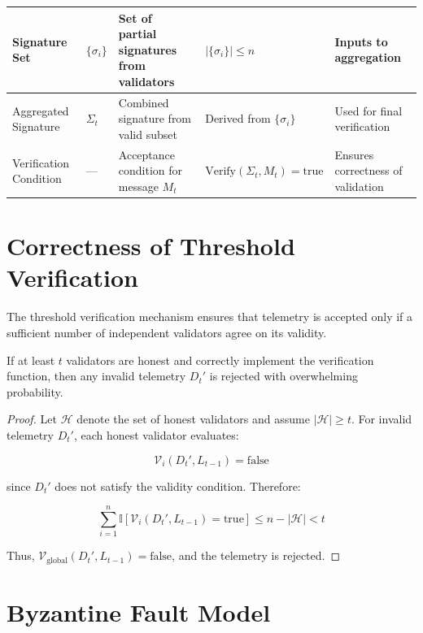 \begin{table}[htbp]
\begin{tabularx}{\textwidth}{|p{2.5cm}|p{2cm}|X|X|X|}
\hline

Signature Set & $\{\sigma_i\}$ & Set of partial signatures from validators & $|\{\sigma_i\}| \leq n$ & Inputs to aggregation \\

\hline

Aggregated Signature & $\Sigma_t$ & Combined signature from valid subset & Derived from $\{\sigma_i\}$ & Used for final verification \\

\hline

Verification Condition & --- & Acceptance condition for message $M_t$ & $\text{Verify}(\Sigma_t, M_t) = \text{true}$ & Ensures correctness of validation \\

\hline

\end{tabularx}
\end{table}

\section{Correctness of Threshold Verification}

The threshold verification mechanism ensures that telemetry is accepted only if a sufficient number of independent validators agree on its validity.

\begin{theorem}
If at least $t$ validators are honest and correctly implement the verification function, then any invalid telemetry $D_t'$ is rejected with overwhelming probability.
\end{theorem}

\begin{proof}
Let $\mathcal{H}$ denote the set of honest validators and assume $|\mathcal{H}| \geq t$. For invalid telemetry $D_t'$, each honest validator evaluates:

\[
\mathcal{V}_i(D_t', L_{t-1}) = \text{false}
\]

since $D_t'$ does not satisfy the validity condition. Therefore:

\[
\sum_{i=1}^{n} \mathbb{I}[\mathcal{V}_i(D_t', L_{t-1}) = \text{true}] \leq n - |\mathcal{H}| < t
\]

Thus, $\mathcal{V}_{\text{global}}(D_t', L_{t-1}) = \text{false}$, and the telemetry is rejected.
\end{proof}

\section{Byzantine Fault Model}

